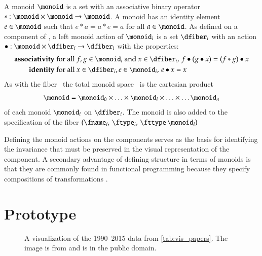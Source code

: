 \documentclass[journal]{vgtc}                %
\begin{document}
A monoid \cite{Monoid2021} $\monoid$ is a set with an associative binary operator $\ast:\monoid \times \monoid\rightarrow \monoid$. A monoid has an identity element $e\in \monoid$ such that $e\ast a= a \ast e = a$ for all $a \in \monoid$. As defined on a component of \dfiber, a left monoid action \cite{SemigroupAction2021,ActionNLab} of $\monoid_i$ is a set $\dfiber_i$ with an action $\bullet: \monoid\times \dfiber_i \rightarrow \dfiber_i$ with the properties:
\begin{align*}
    \textbf{associativity}\;& \text{for all } f,g \in \monoid_i \text{ and } x\in \dfiber_i,\, f\bullet(g\bullet x) = (f\ast g) \bullet x\\
    \textbf{identity}\;& \text{for all } x\in \dfiber_i, e\in \monoid_i,\,  e\bullet x = x 
\end{align*}
As with the fiber \dfiber\, the total monoid space \monoid\ is the cartesian product
\begin{equation}
\monoid= \monoid_{0} \times \ldots \times \monoid_{i}\times \ldots \times\ldots \monoid_{n}
\end{equation}
of each monoid $\monoid_{i}$ on $\dfiber_{i}$.  The monoid is also added to the specification of the fiber $(\fname_i,\, \ftype_i,\, \fttype\, \monoid_i)$

Defining the monoid actions on the components serves as the basis for identifying the invariance\cite{kindlmannAlgebraicProcessVisualization2014} that must be preserved in the visual representation of the component. A secondary advantage of defining structure in terms of monoids is that they are commonly found in functional programming because they specify compositions of transformations \cite{yorgeyMonoidsThemeVariations, stievenMonadJustMonoid2020}. 
\subsubsection{}

\section{Prototype}

\begin{figure}[tb]
 \centering %
 \caption{A visualization of the 1990--2015 data from \autoref{tab:vis_papers}. The image is from \cite{Isenberg:2017:VMC} and is in the public domain.}
 \label{fig:sample}
\end{figure}
\end{document}
